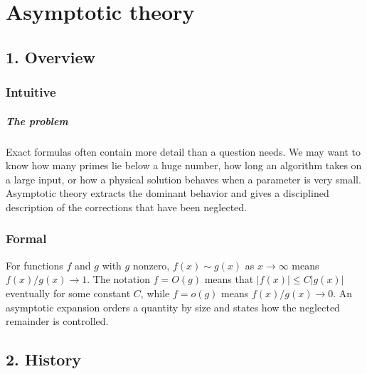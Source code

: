 \clearpage\chapter{Asymptotic theory}
\section*{1. Overview}
\subsection*{Intuitive}
\paragraph{The problem}

Exact formulas often contain more detail than a question needs. We may want to know how many primes lie below a huge number, how long an algorithm takes on a large input, or how a physical solution behaves when a parameter is very small. Asymptotic theory extracts the dominant behavior and gives a disciplined description of the corrections that have been neglected.



\subsection*{Formal}
For functions $f$ and $g$ with $g$ nonzero, $f(x)\sim g(x)$ as $x\to\infty$ means $f(x)/g(x)\to1$. The notation $f=O(g)$ means that $|f(x)|\leq C|g(x)|$ eventually for some constant $C$, while $f=o(g)$ means $f(x)/g(x)\to0$. An asymptotic expansion orders a quantity by size and states how the neglected remainder is controlled.
\section*{2. History}
